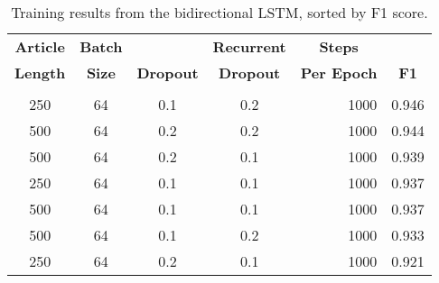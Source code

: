 
\begin{table}[H]
    \centering
    \caption{Training results from the bidirectional LSTM, sorted by F1 score.}
    \label{tab:bires}
    \begin{tabular}{c|c|c|c|r|c}
    \hline \hline
    \multicolumn{1}{c}{\textbf{Article}}   & \multicolumn{1}{|c}{\textbf{Batch}}  & \multicolumn{1}{|c}{}                     & \multicolumn{1}{|c}{\textbf{Recurrent}}        & \multicolumn{1}{|c}{\textbf{Steps}}     &  \multicolumn{1}{|c}{}  \\
    \multicolumn{1}{c}{\textbf{Length}}    & \multicolumn{1}{|c}{\textbf{Size}}       & \multicolumn{1}{|c}{\textbf{Dropout}} & \multicolumn{1}{|c}{\textbf{Dropout}}          & \multicolumn{1}{|c}{\textbf{Per Epoch}} & \multicolumn{1}{|c}{\textbf{F1}} \\
    \hline 
    &&&&& \\
    250                                & 64                             & 0.1                         & 0.2                                  & 1000                                & 0.946                  \\
    500                                & 64                             & 0.2                         & 0.2                                  & 1000                                & 0.944                  \\
    500                                & 64                             & 0.2                         & 0.1                                  & 1000                                & 0.939                  \\
    250                                & 64                             & 0.1                         & 0.1                                  & 1000                                & 0.937                  \\
    500                                & 64                             & 0.1                         & 0.1                                  & 1000                                & 0.937                  \\
    500                                & 64                             & 0.1                         & 0.2                                  & 1000                                & 0.933                  \\
    250                                & 64                             & 0.2                         & 0.1                                  & 1000                                & 0.921                  \\

\end{tabular}
\end{table}
